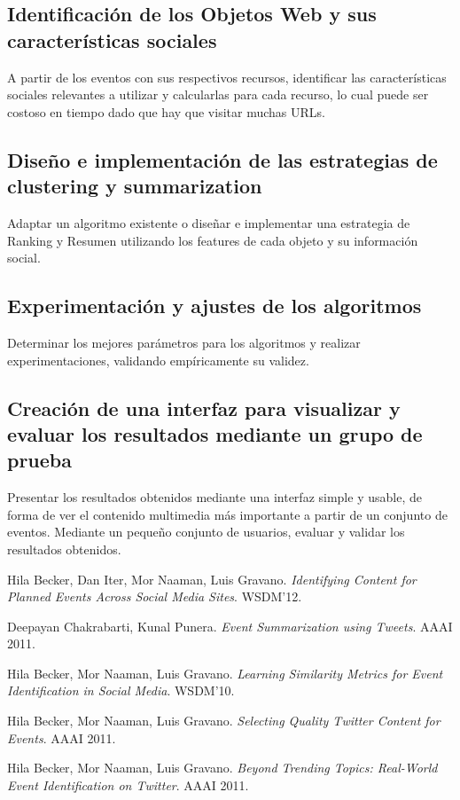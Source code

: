 \documentclass[11pt]{article}
\begin{document}
\subsection{Identificación de los Objetos Web y sus características sociales}
\label{sec-5.2}


    A partir de los eventos con sus respectivos recursos, identificar las características sociales relevantes a utilizar y calcularlas para cada recurso, lo cual puede ser costoso en tiempo dado que hay que visitar muchas URLs.

\subsection{Diseño e implementación de las estrategias de clustering y summarization}
\label{sec-5.3}


    Adaptar un algoritmo existente o diseñar e implementar una estrategia de Ranking y Resumen utilizando los features de cada objeto y su información social.

\subsection{Experimentación y ajustes de los algoritmos}
\label{sec-5.4}


    Determinar los mejores parámetros para los algoritmos y realizar experimentaciones, validando empíricamente su validez.

\subsection{Creación de una interfaz para visualizar y evaluar los resultados mediante un grupo de prueba}
\label{sec-5.5}


    Presentar los resultados obtenidos mediante una interfaz simple y usable, de forma de ver el contenido multimedia más importante a partir de un conjunto de eventos. Mediante un pequeño conjunto de usuarios, evaluar y validar los resultados obtenidos.



\newpage
\begin{thebibliography}{9}

Hila Becker, Dan Iter, Mor Naaman, Luis Gravano. \emph{Identifying Content for Planned Events Across Social Media Sites}. WSDM'12.


Deepayan Chakrabarti, Kunal Punera. \emph{Event Summarization using Tweets}. AAAI 2011.


Hila Becker, Mor Naaman, Luis Gravano. \emph{Learning Similarity Metrics for Event Identification in Social Media}. WSDM'10.


Hila Becker, Mor Naaman, Luis Gravano. \emph{Selecting Quality Twitter Content for Events}. AAAI 2011.


Hila Becker, Mor Naaman, Luis Gravano. \emph{Beyond Trending Topics: Real-World Event Identification on Twitter}. AAAI 2011.

\end{thebibliography}
\end{document}
